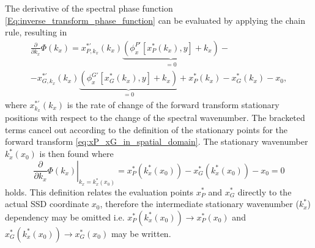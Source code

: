 The derivative of the spectral phase function \eqref{Eq:inverse_transform_phase_function} can be evaluated by applying the chain rule, resulting in
\begin{multline}
\label{eq:spectral_phase_first_derivative}
\frac{\partial}{\partial k_x}\Phi(k_x) =  
  x^{*'}_{P,k_x}(k_x) \underbrace{ \left( \phi^{P'}_x[x^*_P(k_x),y]  + k_x \right)}_{ = 0} - \\	
- x^{*'}_{G,k_x}(k_x) \underbrace{ \left( \phi^{G'}_x[x^*_G(k_x),y]  + k_x \right) }_{ = 0} 
+x^*_P(k_x)- x^*_G(k_x) -  x_0,
\end{multline}
where $x^{*'}_{k_x}(k_x)$ is the rate of change of the forward transform stationary positions with respect to the change of the spectral wavenumber.
The bracketed terms cancel out according to the definition of the stationary points for the forward transform \eqref{eq:xP_xG_in_spatial_domain}.
The stationary wavenumber $k_x^*(x_0)$ is then found where
\begin{equation}
\label{eq:xP_xG_in_spectral_domain}
\left. \frac{\partial}{\partial k_x}\Phi(k_x) \right|_{k_x=k_x^*(x_0)} = x^*_P(k_x^*(x_0))- x^*_G(k_x^*(x_0)) -  x_0 = 0
\end{equation}
holds.
This definition relates the evaluation points $x^*_P$ and $x^*_G$ directly to the actual SSD coordinate $x_0$, therefore the intermediate stationary wavenumber ($k_x^*$) dependency may be omitted i.e. $x^*_P(k_x^*(x_0)) \rightarrow x^*_P(x_0)$ and $x^*_G(k_x^*(x_0)) \rightarrow x^*_G(x_0)$ may be written. 

